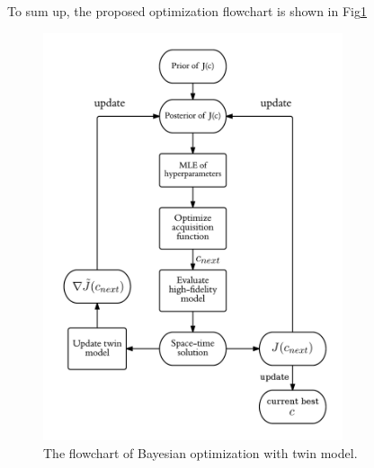\documentclass[a4paper,onecolumn]{article}
\theoremstyle{remark}
\begin{document}
\noindent To sum up, the proposed optimization flowchart is shown in Fig\ref{fig: Bopt flow}
\begin{figure}[H]
    \begin{center}
        \includegraphics[height=12cm]{Bopt_flowchart.png}
        \caption{The flowchart of Bayesian optimization with twin model.}
        \label{fig: Bopt flow}
    \end{center}
\end{figure}
\end{document}
